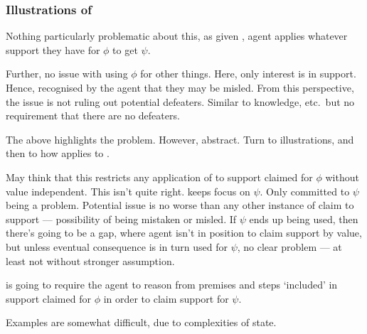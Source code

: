 \subsubsection{Illustrations of \nI{}}
\label{sec:illustrations-ni}

\begin{note}
  Nothing particularly problematic about this, as given \incl{}, agent applies whatever support they have for \(\phi\) to get \(\psi\).

  Further, no issue with using \(\phi\) for other things.
  Here, only interest is in support.
  Hence, recognised by the agent that they may be misled.
  From this perspective, the issue is not ruling out potential defeaters.
  Similar to knowledge, etc.\ but no requirement that there are no defeaters.
\end{note}

\begin{note}
  The above highlights the problem.
  However, abstract.
  Turn to illustrations, and then to how \nI{} applies to \gsi{}.
\end{note}


\begin{note}
  May think that this restricts any application of \RBV{} to support claimed for \(\phi\) without value independent.
  This isn't quite right.
  \eiS{} keeps focus on \(\psi\).
  Only committed to \(\psi\) being a problem.
  Potential issue is no worse than any other instance of claim to support --- possibility of being mistaken or misled.
  If \(\psi\) ends up being used, then there's going to be a gap, where agent isn't in position to claim support by value, but unless eventual consequence is in turn used for \(\psi\), no clear problem --- at least not without stronger assumption.
\end{note}

\begin{note}
  \uRa{} is going to require the agent to reason from premises and steps `included' in support claimed for \(\phi\) in order to claim support for \(\psi\).
\end{note}


\begin{note}[Examples]
  Examples are somewhat difficult, due to complexities of state.
\end{note}

